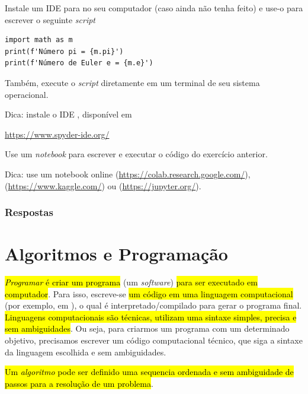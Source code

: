 \begin{exer}
  Instale um IDE para {\python} no seu computador (caso ainda não tenha feito) e use-o para escrever o seguinte \textit{script}

\begin{lstlisting}
import math as m
print(f'Número pi = {m.pi}')
print(f'Número de Euler e = {m.e}')
\end{lstlisting}

  Também, execute o \textit{script} diretamente em um terminal de seu sistema operacional.
\end{exer}
\begin{resp}
  Dica: instale o IDE {\spyder}, disponível em
  \begin{center}
    \url{https://www.spyder-ide.org/}
  \end{center}
\end{resp}

\begin{exer}
  Use um \textit{notebook} {\python} para escrever e executar o código do exercício anterior.
\end{exer}
\begin{resp}
  Dica: use um notebook online {\colab} (\url{https://colab.research.google.com/}), {\kaggle} (\url{https://www.kaggle.com/}) ou {\jupyter} (\url{https://jupyter.org/}).
\end{resp}

\ifisbook
\subsubsection{Respostas}
\shipoutAnswer
\fi

\section{Algoritmos e Programação}\label{cap_lingua_sec_algoprog}

\hl{\emph{Programar} é criar um programa} (um \textit{software}) \hl{para ser executado em computador}. Para isso, escreve-se \hl{um código em uma linguagem computacional} (por exemplo, em {\python}), o qual é interpretado/compilado para gerar o programa final. \hl{Linguagens computacionais são técnicas, utilizam uma sintaxe simples, precisa e sem ambiguidades}. Ou seja, para criarmos um programa com um determinado objetivo, precisamos escrever um código computacional técnico, que siga a sintaxe da linguagem escolhida e sem ambiguidades.

\hl{Um \emph{algoritmo} pode ser definido uma sequencia ordenada e sem ambiguidade de passos para a resolução de um problema}.

